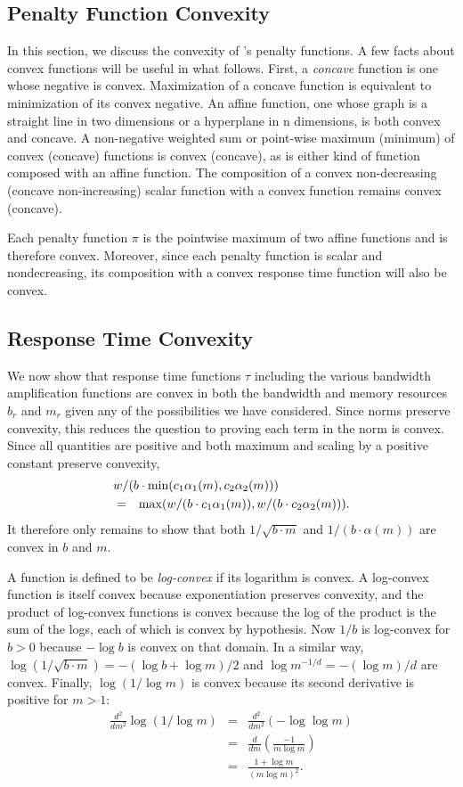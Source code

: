 \subsection{Penalty Function Convexity}
In this section, we discuss the convexity of \pacora's penalty functions.
A few facts about convex functions will be useful in what follows.
First, a \emph{concave} function is one whose negative is convex.
Maximization of a concave function is equivalent to minimization of its convex negative.
An affine function, one whose graph is a straight line in two dimensions or a hyperplane in n dimensions,
is both convex and concave.  A non-negative weighted sum or point-wise maximum (minimum) of convex (concave) functions is convex (concave), as is either kind of function composed with an affine function.  The composition of a convex non-decreasing (concave non-increasing) scalar function with a convex function remains convex (concave).

Each penalty function $\pi$ is the pointwise maximum of two affine functions and is therefore convex.
Moreover, since each penalty function is scalar and nondecreasing,
its composition with a convex response time function will also be convex.

\subsection{Response Time Convexity}
We now show that response time functions $\tau$ including the various bandwidth amplification functions are convex
in both the bandwidth and memory resources $b_r$ and $m_r$ given any of the possibilities we have considered.
Since norms preserve convexity, this reduces the question to proving each term in the norm is convex.
Since all quantities are positive and both maximum and scaling by a positive constant preserve convexity,
\begin{eqnarray*}
\lefteqn{w/(b\cdot\min(c_1\alpha_1(m),c_2\alpha_2(m)))}   \\
&=& \max(w/(b\cdot c_1\alpha_1(m)),w/(b\cdot c_2\alpha_2(m))).
\end{eqnarray*}
It therefore only remains to show that both $1/\sqrt{b\cdot m}$ and $1/(b\cdot\alpha(m))$ are convex in $b$ and $m$.

A function is defined to be \emph{log-convex} if its logarithm is convex.
A log-convex function is itself convex because exponentiation preserves convexity,
and the product of log-convex functions is convex because the log of the product is the sum of the logs,
each of which is convex by hypothesis.
Now $1/b$ is log-convex for $b > 0$ because $-\log b$ is convex on that domain.
In a similar way, $\log(1/\sqrt{b\cdot m}) = -(\log b + \log m)/2$
and $\log m^{-1/d} = -(\log m)/d$ are convex.
Finally, $\log (1/\log m)$ is convex because its second derivative is positive for $m > 1$:
\begin{eqnarray*}
\frac{d^2}{dm^2}\log (1/\log m) &=& \frac{d^2}{dm^2}(-\log\log m)  \\
                                  &=& \frac{d}{dm}\left(\frac{-1}{m\log m}\right) \\
                                  &=& \frac{1 + \log m}{(m\log m)^2}.
\end{eqnarray*}

